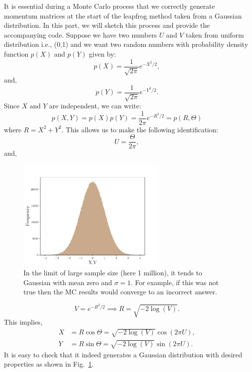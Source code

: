 \documentclass[11pt]{article}
\begin{document}
It is essential during a Monte Carlo process that we correctly generate momentum matrices at the start of the leapfrog method taken from a Gaussian distribution. In this part, we will sketch this process and provide the accompanying code. 
Suppose we have two numbers $U$ and $V$ taken from uniform distribution i.e., (0,1) 
and we want two random numbers with probability density function $p(X)$ and $p(Y)$ given by:
\begin{equation}
	p(X) = \frac{1}{\sqrt{2\pi}} e^{-X^2/2}, 
\end{equation}
and, 
\begin{equation}
	p(Y) = \frac{1}{\sqrt{2\pi}} e^{-Y^2/2} .
\end{equation}
Since $X$ and $Y$ are independent, we can write:
\begin{equation}
	p(X,Y) = p(X) p(Y) = \frac{1}{2\pi} e^{-R^2/2} = p(R, \Theta) 
\end{equation}
where $R = X^2 + Y^2$. This allows us to make the following identification:
\begin{equation}
	U = \frac{\Theta}{2\pi}, 
\end{equation}
and, 

\begin{figure}[htbp] 
	\centering 
	\includegraphics[width=0.65\textwidth]{figs/testRN.pdf}
	\caption{\label{fig:RN}In the limit of large sample size (here 1 million), 
	it tends to Gaussian with mean zero and $\sigma=1$. For example, if 
	this was not true then the MC results would converge to an incorrect answer.}
\end{figure}
\begin{equation}
	V = e^{-R^2/2} \implies R = \sqrt{-2 \log(V)}. 
\end{equation}
This implies, 
\begin{align}
	X &= R \cos \Theta = \sqrt{-2 \log(V)} \cos(2 \pi U), \\
	Y &= R \sin \Theta = \sqrt{-2 \log(V)} \sin(2 \pi U).
\end{align}
It is easy to check that it indeed generates a 
Gaussian distribution with desired properties as shown in Fig.~\ref{fig:RN}. 
\end{document}

